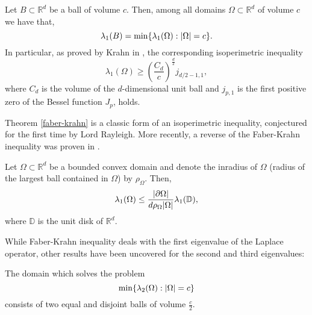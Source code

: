 \begin{theorem}\label{faber-krahn}
    Let \(B \subset \mathbb{R}^d\) be a ball of volume \(c\). Then, among all domains \(\Omega \subset \mathbb{R}^d\) of volume \(c\) we have that,
    \[
    \lambda_1(B) = \min\{\lambda_1(\Omega): \abs{\Omega} = c\}.
    \]
    In particular, as proved by Krahn in \cite{krahn1926minimaleigenschaften}, the corresponding isoperimetric inequality
    \[
        \lambda_1(\Omega) \geq \left(\frac{C_d}{c}\right)^\frac{d}{2}j_{d/2-1, 1},
    \]
    where \(C_d\) is the volume of the \(d\)-dimensional unit ball and \(j_{p,1}\) is the first positive zero of the Bessel function \(J_p\), holds.
\end{theorem}

Theorem \ref{faber-krahn} is a classic form of an isoperimetric inequality, conjectured for the first time by Lord Rayleigh. More recently, a reverse of the Faber-Krahn inequality was proven in \cite{freitas2008sharp}.
\begin{theorem}\label{reverse_faber-krahn}
    Let \(\Omega \subset \mathbb{R}^d\) be a bounded convex domain and denote the inradius of \(\Omega\) (radius of the largest ball contained in \(\Omega\)) by \(\rho_\Omega\). Then,
    \[
    \lambda_1(\Omega) \leq \frac{\abs{\partial \Omega}}{d \rho_\Omega \abs{\Omega}} \lambda_1(\mathbb{D}),
    \]
    where \(\mathbb{D}\) is the unit disk of \(\mathbb{R}^d\).
\end{theorem}   

While Faber-Krahn inequality deals with the first eigenvalue of the Laplace operator, other results have been uncovered for the second and third eigenvalues:

\begin{theorem}\label{krahn_szego}
    The domain which solves the problem
    \[
    \min\{\lambda_2(\Omega): \abs{\Omega} = c\}
    \]
    consists of two equal and disjoint balls of volume \(\frac{c}{2}\).
\end{theorem}

